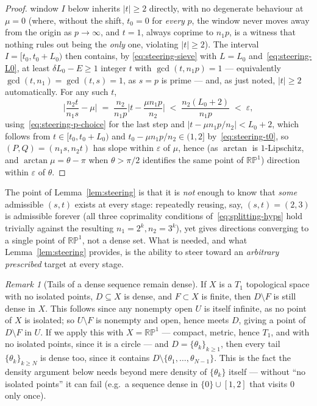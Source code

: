 \documentclass[a4paper,11pt,oneside,reqno]{amsart}
\theoremstyle{definition}
\theoremstyle{remark}
\newtheorem{remark}[definition]{Remark}
\theoremstyle{plain}
\newcommand{\RP}{\mathbb{RP}^1}
\begin{document}
\begin{proof}
  window \(I\) below inherits \(|t|\ge2\) directly, with no degenerate behaviour at \(\mu=0\) (where,
  without the shift, \(t_0=0\) for \emph{every} \(p\), the window never moves away from the origin as
  \(p\to\infty\), and \(t=1\), always coprime to \(n_1p\), is a witness that nothing rules out being
  the \emph{only} one, violating \(|t|\ge2\)). The interval \(I=[t_0,t_0+L_0)\) then contains, by
  \eqref{eq:steering-sieve} with \(L=L_0\) and~\eqref{eq:steering-L0}, at least \(\delta L_0-E\ge1\)
  integer \(t\) with \(\gcd(t,n_1p)=1\) --- equivalently \(\gcd(t,n_1)=\gcd(t,s)=1\), as \(s=p\) is prime
  --- and, as just noted, \(|t|\ge2\) automatically. For any such \(t\),
  \begin{equation}
    \label{eq:steering-final-bound}
    \Big|\frac{n_2t}{n_1s}-\mu\Big| \;=\; \frac{n_2}{n_1p}\Big|t-\frac{\mu n_1p}{n_2}\Big| \;<\;
    \frac{n_2(L_0+2)}{n_1p} \;<\; \varepsilon,
  \end{equation}
  using~\eqref{eq:steering-p-choice} for the last step and \(\big|t-\mu n_1p/n_2\big|<L_0+2\), which
  follows from \(t\in[t_0,t_0+L_0)\) and \(t_0-\mu n_1p/n_2\in(1,2]\) by~\eqref{eq:steering-t0}, so
  \((P,Q)=(n_1s,n_2t)\) has slope within \(\varepsilon\) of \(\mu\), hence (as \(\arctan\) is
  \(1\)-Lipschitz, and \(\arctan\mu=\theta-\pi\) when \(\theta>\pi/2\) identifies the same point of
  \(\RP\)) direction within \(\varepsilon\) of \(\theta\).
\end{proof}

The point of Lemma~\ref{lem:steering} is that it is \emph{not} enough to know that \emph{some}
admissible \((s,t)\) exists at every stage: repeatedly reusing, say, \((s,t)=(2,3)\) is admissible
forever (all three coprimality conditions of~\eqref{eq:splitting-hyps} hold trivially against the
resulting \(n_1=2^{k},n_2=3^{k}\)), yet gives directions converging to a single point of \(\RP\), not a
dense set. What is needed, and what Lemma~\ref{lem:steering} provides, is the ability to steer
toward an \emph{arbitrary prescribed} target at every stage.

\begin{remark}[Tails of a dense sequence remain dense]
  \label{rem:tail-density}
  If \(X\) is a \(T_1\) topological space with no isolated points, \(D\subseteq X\) is dense, and
  \(F\subset X\) is finite, then \(D\setminus F\) is still dense in \(X\). This follows since any
  nonempty open \(U\) is itself infinite, as no point of \(X\) is isolated; so \(U\setminus F\) is
  nonempty and open, hence meets \(D\), giving a point of \(D\setminus F\) in \(U\). If we apply this
  with \(X=\RP\) --- compact, metric, hence \(T_1\), and with no isolated points, since it is a
  circle --- and \(D=\{\theta_k\}_{k\ge1}\), then every tail \(\{\theta_k\}_{k\ge N}\) is dense too,
  since it contains \(D\setminus\{\theta_1,\dots,\theta_{N-1}\}\).
  This is the fact the density argument below needs beyond mere density of \(\{\theta_k\}\) itself
  --- without ``no isolated points'' it can fail (e.g.\ a sequence dense in \(\{0\}\cup[1,2]\) that
  visits \(0\) only once).
\end{remark}
\end{document}
